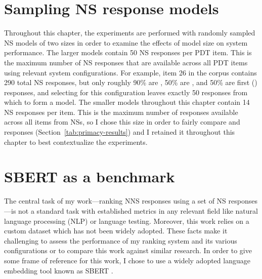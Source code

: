 

\section{Sampling NS response models}
\label{sec:sampling}

Throughout this chapter, the experiments are performed with randomly sampled NS models of two sizes in order to examine the effects of model size on system performance. The larger models contain 50 NS responses per PDT item. This is the maximum number of NS responses that are available across all PDT items using relevant system configurations. For example, item 26 in the corpus contains 290 total NS responses, but only roughly 90\% are , 50\% are , and 50\% are first () responses, and selecting for this configuration leaves exactly 50 responses from which to form a model. The smaller models throughout this chapter contain 14 NS responses per item. This is the maximum number of responses available across all items from  NSs, so I chose this size in order to fairly compare  and  responses (Section~\ref{tab:primacy-results}) and I retained it throughout this chapter to best contextualize the  experiments.

\section{SBERT as a benchmark}
\label{sec:bert-benchmark}
The central task of my work---ranking NNS responses using a set of NS responses---is not a standard task with established metrics in any relevant field like natural language processing (NLP) or language testing. Moreover, this work relies on a custom dataset which has not been widely adopted. These facts make it challenging to assess the performance of my ranking system and its various configurations or to compare this work against similar research. In order to give some frame of reference for this work, I chose to use a widely adopted language embedding tool known as SBERT \cite{sbert2020}.

